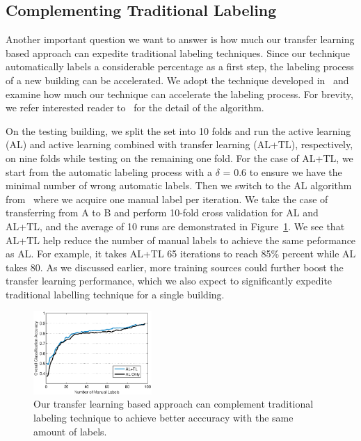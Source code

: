 \subsection{Complementing Traditional Labeling}
Another important question we want to answer is how much our transfer learning based approach can expedite traditional labeling techniques. 
Since our technique automatically labels a considerable percentage as a first step, the labeling process of a new building can be accelerated.
We adopt the technique developed in~\cite{cikm} and examine how much our technique can accelerate the labeling process.
For brevity, we refer interested reader to~\cite{cikm} for the detail of the algorithm.

On the testing building, we split the set into 10 folds and run the active learning (AL) and active learning combined with transfer learning (AL+TL), respectively, on nine folds while testing on the remaining one fold.
For the case of AL+TL, we start from the automatic labeling process with a $\delta$ = 0.6 to ensure we have the minimal number of wrong automatic labels. Then we switch to the AL algorithm from~\cite{cikm} where we acquire one manual label per iteration.
We take the case of transferring from A to B and perform 10-fold cross validation for AL and AL+TL, and the average of 10 runs are demonstrated in Figure~\ref{fig:comp}. 
We see that AL+TL help reduce the number of manual labels to achieve the same peformance as AL.
For example, it takes AL+TL 65 iterations to reach 85\% percent while AL takes 80.
As we discussed earlier, more training sources could further boost the transfer learning performance, which we also expect to significantly expedite traditional labelling technique for a single building.

\begin{figure}[t]
\centering
\includegraphics[width=0.4\textwidth]{./fig/tl_al.eps}
\caption{Our transfer learning based approach can complement traditional labeling technique to achieve better acccuracy with the same amount of labels.}
\label{fig:comp}
\end{figure}


